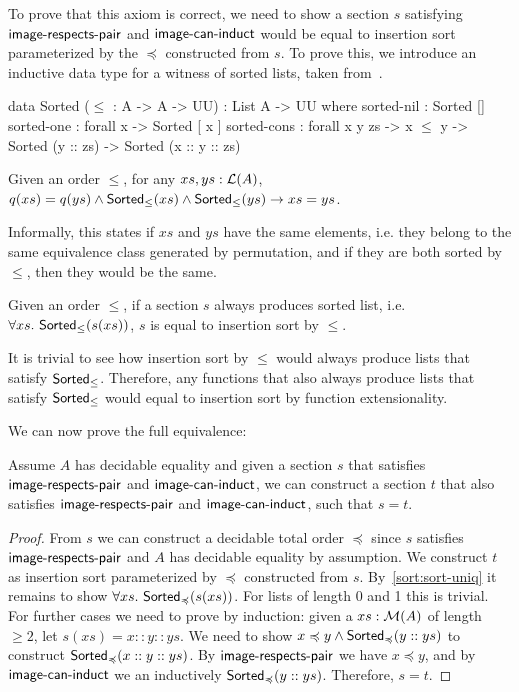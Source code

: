 To prove that this axiom is correct, we need to show a section $s$ satisfying
$\operatorname{\mathsf{image-respects-pair}}$ and $\operatorname{\mathsf{image-can-induct}}$ would be equal to insertion sort parameterized by
the $\preccurlyeq$ constructed from $s$. To prove this, we introduce an inductive data type
for a witness of sorted lists, taken from~\cite{appelVerifiedFunctionalAlgorithms2023}.

\begin{code}
data Sorted ($\leq$ : A -> A -> UU) : List A -> UU where
  sorted-nil : Sorted []
  sorted-one : forall x -> Sorted [ x ]
  sorted-cons : forall x y zs -> x $\leq$ y -> Sorted (y :: zs) -> Sorted (x :: y :: zs)
\end{code}

\begin{proposition}
    Given an order $\leq$, for any $xs, ys : \mathcal{L}(A)$,
    $q(xs) = q(ys) \land \operatorname{\mathsf{Sorted}}_{\leq}(xs) \land \operatorname{\mathsf{Sorted}}_{\leq}(ys) \to xs = ys$.
\end{proposition}

Informally, this states if $xs$ and $ys$ have the same elements, i.e. they belong to the same
equivalence class generated by permutation, and if they are both sorted by $\leq$, then they would be the same.

\begin{corollary}\label{sort:sort-uniq}
    Given an order $\leq$,
    if a section $s$ always produces sorted list, i.e. $\forall xs.\,\operatorname{\mathsf{Sorted}}_{\leq}(s(xs))$,
    $s$ is equal to insertion sort by $\leq$.
\end{corollary}
It is trivial to see how insertion sort by $\leq$ would always produce lists that satisfy
$\operatorname{\mathsf{Sorted}}_{\leq}$. Therefore, any functions that also always produce lists that satisfy
$\operatorname{\mathsf{Sorted}}_{\leq}$ would equal to insertion sort by function extensionality.

We can now prove the full equivalence:
\begin{proposition}\label{sort:s2o2s}
Assume $A$ has decidable equality and given a section $s$ that satisfies $\operatorname{\mathsf{image-respects-pair}}$ and $\operatorname{\mathsf{image-can-induct}}$, 
we can construct a section $t$ that also satisfies $\operatorname{\mathsf{image-respects-pair}}$ and $\operatorname{\mathsf{image-can-induct}}$, such that $s = t$.
\end{proposition}
\begin{proof}
    From $s$ we can construct a decidable total order $\preccurlyeq$ since $s$ satisfies
    $\operatorname{\mathsf{image-respects-pair}}$ and $A$ has decidable equality by assumption.
    We construct $t$ as insertion sort parameterized by $\preccurlyeq$ constructed from $s$.
    By~\cref{sort:sort-uniq} it remains to show $\forall xs.\,\operatorname{\mathsf{Sorted}}_{\preccurlyeq}(s(xs))$.
    For lists of length 0 and 1 this is trivial. For further cases we need to prove by induction:
    given a $xs : \mathcal{M}(A)$ of length $\geq 2$, let $s(xs) = x :: y :: ys$. We need to show
    $x \preccurlyeq y \land \operatorname{\mathsf{Sorted}}_{\preccurlyeq}(y :: ys)$ to construct
    $\operatorname{\mathsf{Sorted}}_{\preccurlyeq}(x :: y :: ys)$.
    By $\operatorname{\mathsf{image-respects-pair}}$ we have $x \preccurlyeq y$, and by $\operatorname{\mathsf{image-can-induct}}$ we an
    inductively $\operatorname{\mathsf{Sorted}}_{\preccurlyeq}(y :: ys)$.
    Therefore, $s = t$.
\end{proof}

